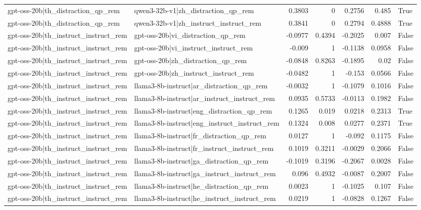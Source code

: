 \begin{table}
\begin{tabular}{l l r r r r l}
gpt-oss-20b|th_distraction_qp_rem & qwen3-32b-v1|zh_distraction_qp_rem & 0.3803 & 0 & 0.2756 & 0.485 & True \\
gpt-oss-20b|th_distraction_qp_rem & qwen3-32b-v1|zh_instruct_instruct_rem & 0.3841 & 0 & 0.2794 & 0.4888 & True \\
gpt-oss-20b|th_instruct_instruct_rem & gpt-oss-20b|vi_distraction_qp_rem & -0.0977 & 0.4394 & -0.2025 & 0.007 & False \\
gpt-oss-20b|th_instruct_instruct_rem & gpt-oss-20b|vi_instruct_instruct_rem & -0.009 & 1 & -0.1138 & 0.0958 & False \\
gpt-oss-20b|th_instruct_instruct_rem & gpt-oss-20b|zh_distraction_qp_rem & -0.0848 & 0.8263 & -0.1895 & 0.02 & False \\
gpt-oss-20b|th_instruct_instruct_rem & gpt-oss-20b|zh_instruct_instruct_rem & -0.0482 & 1 & -0.153 & 0.0566 & False \\
gpt-oss-20b|th_instruct_instruct_rem & llama3-8b-instruct|ar_distraction_qp_rem & -0.0032 & 1 & -0.1079 & 0.1016 & False \\
gpt-oss-20b|th_instruct_instruct_rem & llama3-8b-instruct|ar_instruct_instruct_rem & 0.0935 & 0.5733 & -0.0113 & 0.1982 & False \\
gpt-oss-20b|th_instruct_instruct_rem & llama3-8b-instruct|eng_distraction_qp_rem & 0.1265 & 0.019 & 0.0218 & 0.2313 & True \\
gpt-oss-20b|th_instruct_instruct_rem & llama3-8b-instruct|eng_instruct_instruct_rem & 0.1324 & 0.008 & 0.0277 & 0.2371 & True \\
gpt-oss-20b|th_instruct_instruct_rem & llama3-8b-instruct|fr_distraction_qp_rem & 0.0127 & 1 & -0.092 & 0.1175 & False \\
gpt-oss-20b|th_instruct_instruct_rem & llama3-8b-instruct|fr_instruct_instruct_rem & 0.1019 & 0.3211 & -0.0029 & 0.2066 & False \\
gpt-oss-20b|th_instruct_instruct_rem & llama3-8b-instruct|ga_distraction_qp_rem & -0.1019 & 0.3196 & -0.2067 & 0.0028 & False \\
gpt-oss-20b|th_instruct_instruct_rem & llama3-8b-instruct|ga_instruct_instruct_rem & 0.096 & 0.4932 & -0.0087 & 0.2007 & False \\
gpt-oss-20b|th_instruct_instruct_rem & llama3-8b-instruct|he_distraction_qp_rem & 0.0023 & 1 & -0.1025 & 0.107 & False \\
gpt-oss-20b|th_instruct_instruct_rem & llama3-8b-instruct|he_instruct_instruct_rem & 0.0219 & 1 & -0.0828 & 0.1267 & False \\

\end{tabular}
\end{table}
